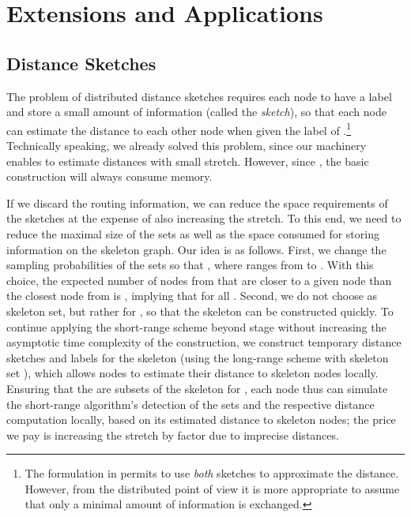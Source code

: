 \documentclass[letterpaper,11pt]{article}
\begin{document}
\section{Extensions and Applications}
\label{sec-ext}

\subsection{Distance Sketches}

The problem of distributed distance sketches requires each node to
have a label and store a small amount of information (called the
\emph{sketch}), so that each node  can estimate the distance to
each other node  when given the label of .\footnote{The formulation in \cite{DDP} permits to use \emph{both} sketches to
  approximate the distance. However, from the distributed point of
  view it is more appropriate to assume that only a minimal amount of
  information is exchanged.}
Technically speaking, we already solved this problem, since our machinery
enables to estimate distances with small stretch. However, since , the basic construction will always consume 
memory.

If we discard the routing information, we can reduce the space requirements of
the sketches at the expense of also increasing the stretch. To this end, we need
to reduce the maximal size of the sets  as well as the space consumed
for storing information on the skeleton graph. Our idea is as follows.
First, we change the sampling probabilities of the sets  so that , where  ranges from  to . With this choice, the
expected number of nodes from  that are closer to a given node than the
closest node from  is , implying that
 for all . Second, we do not choose
 as skeleton set, but rather  for , so that the
skeleton can be constructed quickly. To continue applying the short-range scheme
beyond stage  without increasing the asymptotic time complexity of the
construction, we construct temporary distance sketches and labels for the
skeleton (using the long-range scheme with skeleton set ), which
allows nodes to estimate their distance to skeleton nodes locally. Ensuring that
the  are subsets of the skeleton for , each node thus can
simulate the short-range algorithm's detection of the sets  and the
respective distance computation locally, based on its estimated distance to
skeleton nodes; the price we pay is increasing the stretch by factor 
due to imprecise distances.
\end{document}
